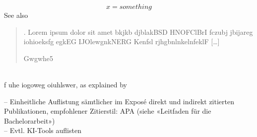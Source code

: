 \documentclass[12pt,a4paper]{article}        %
\begin{document}
\[x=something\]
See also \cite{eg34}
\blockquote[Gwgwhe5]{. Lorem ipsum dolor sit amet  bkjkb djblakBSD HNOFClBrI fczubj jbijareg iohioeksfg egkEG IJOlewgnkNERG Kenfsl rjhgbnlnkelnfeklF […]} \parencite[22]{eg34}\\ %
f uhe iogoweg oiuhlswer, as explained by \textcite{eg34}

\pagebreak

\printbibliography[heading=bibintoc, title={Literaturverzeichnis}] %
– Einheitliche Auflistung sämtlicher im Exposé direkt und indirekt zitierten Publikationen, empfohlener Zitierstil: APA (siehe «Leitfaden für die Bachelorarbeit») \\
– Evtl. KI-Tools auflisten
\end{document}
